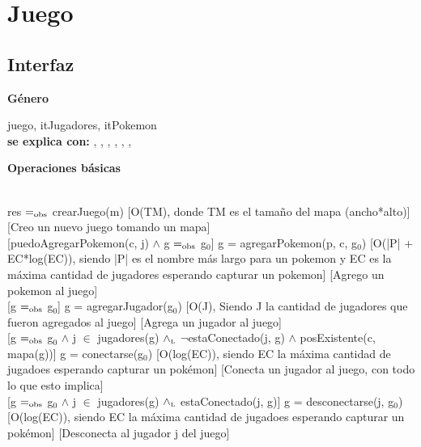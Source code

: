 \section{Juego}

\subsection{Interfaz}

\parbox {1,7cm}{{\bf Género}} juego, itJugadores, itPokemon \\
{\bf se explica con:}  ,  , , , , , \\
\medskip

\parbox {1,5cm}{\bf{Operaciones básicas}}\\

{res $=_{\mathrm{obs}}$ crearJuego(m)}
[O(TM), donde TM es el tamaño del mapa (ancho*alto)]
[Creo un nuevo juego tomando un mapa]\\

[puedoAgregarPokemon(c, j) $\wedge$ g $=_{\mathrm{obs}}$ g$_0$]
{g = agregarPokemon(p, c, g$_0$)}
[O(|P| + EC*log(EC)), siendo |P| es el nombre más largo para un pokemon y EC es la máxima cantidad de jugadores esperando capturar un pokemon]
[Agrego un pokemon al juego]\\

[g $=_{\mathrm{obs}}$ g$_0$]
{g = agregarJugador(g$_0$)}
[O(J), Siendo J la cantidad de jugadores que fueron agregados al juego]
[Agrega un jugador al juego]\\

[g $=_{\mathrm{obs}}$ g$_0$ $\wedge$ j $\in$ jugadores(g) $\land_{\mathrm{\scriptscriptstyle{L}}}$ $\neg$estaConectado(j, g) $\wedge$ posExistente(c, mapa(g))]
{g = conectarse(g$_0$)}
[O(log(EC)), siendo EC la máxima cantidad de jugadoes esperando capturar un pokémon]
[Conecta un jugador al juego, con todo lo que esto implica]\\

[g $=_{\mathrm{obs}}$ g$_0$ $\wedge$ j $\in$ jugadores(g) $\land_{\mathrm{\scriptscriptstyle{L}}}$ estaConectado(j, g)]
{g = desconectarse(j, g$_0$)}
[O(log(EC)), siendo EC la máxima cantidad de jugadoes esperando capturar un pokémon]
[Desconecta al jugador j del juego]\\

